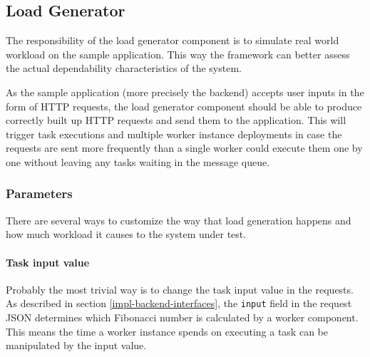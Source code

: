 \subsection{Load Generator}


The responsibility of the load generator component is to simulate real world workload on the sample application. This way the framework can better assess the actual dependability characteristics of the system.

As the sample application (more precisely the backend) accepts user inputs in the form of HTTP requests, the load generator component should be able to produce correctly built up HTTP requests and send them to the application. This will trigger task executions and multiple worker instance deployments in case the requests are sent more frequently than a single worker could execute them one by one without leaving any tasks waiting in the message queue.

\subsubsection{Parameters}


There are several ways to customize the way that load generation happens and how much workload it causes to the system under test.

\paragraph{Task input value} Probably the most trivial way is to change the task input value in the requests. As described in section \ref{impl-backend-interfaces}, the \texttt{input} field in the request JSON determines which Fibonacci number is calculated by a worker component. This means the time a worker instance spends on executing a task can be manipulated by the input value.

